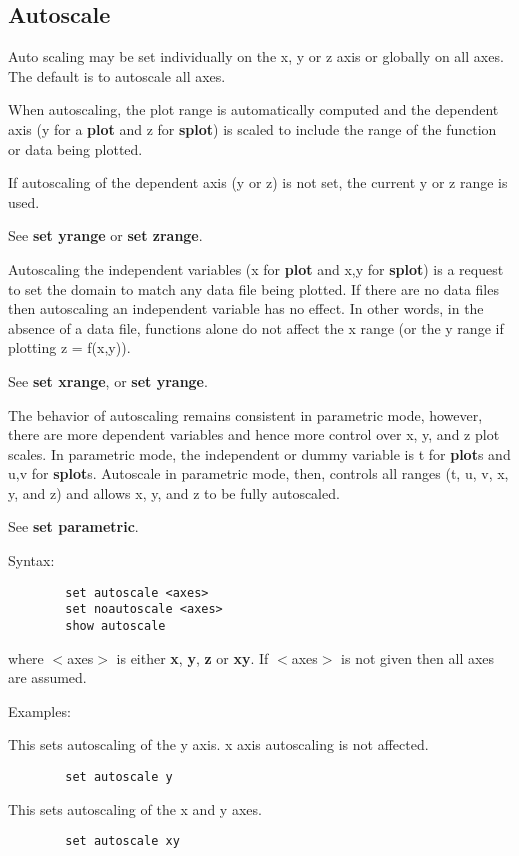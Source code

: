 \subsection{Autoscale}
Auto scaling may be set individually on the x, y or z axis
or globally on all axes. The default is to autoscale all axes.

When autoscaling, the plot range is automatically computed and the
dependent axis (y for a {\bf plot} and z for {\bf splot}) is scaled to
include the range of the function or data being plotted.

If autoscaling of the dependent axis (y or z) is not set, the
current y or z range is used.

See {\bf set yrange} or {\bf set zrange}.

Autoscaling the independent variables (x for {\bf plot} and x,y for
{\bf splot}) is a request to set the domain to match any data file being
plotted. If there are no data files then autoscaling an independent
variable has no effect. In other words, in the absence of a data
file, functions alone do not affect the x range (or the y range if
plotting z = f(x,y)).

See {\bf set xrange}, or {\bf set yrange}.

The behavior of autoscaling remains consistent in parametric mode,
however, there are more dependent variables and hence more control
over x, y, and z plot scales. In parametric mode, the independent or
dummy variable is t for {\bf plot}s and u,v for {\bf splot}s.  Autoscale in
parametric mode, then, controls all ranges (t, u, v, x, y, and z) and
allows x, y, and z to be fully autoscaled.

See {\bf set parametric}.

Syntax:
\begin{verbatim}
        set autoscale <axes>
        set noautoscale <axes>
        show autoscale
\end{verbatim}

where $<$axes$>$ is either {\bf x}, {\bf y}, {\bf z} or {\bf xy}. If $<$axes$>$ is not given
then all axes are assumed.

Examples:

This sets autoscaling of the y axis. x axis autoscaling is not
affected.
\begin{verbatim}
        set autoscale y
\end{verbatim}

This sets autoscaling of the x and y axes.
\begin{verbatim}
        set autoscale xy
\end{verbatim}

